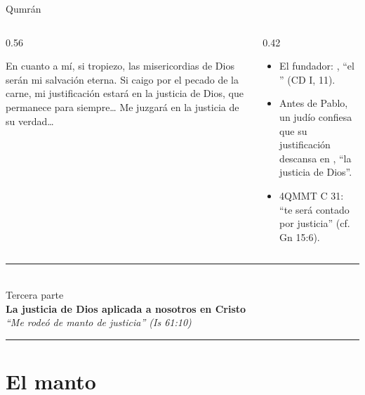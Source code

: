 \begin{frame}{Qumrán}
\begin{columns}[c,onlytextwidth]
\begin{column}{0.56\textwidth}
\begin{cita}En cuanto a mí, si tropiezo, las misericordias de Dios serán mi salvación eterna. Si caigo por el pecado de la carne, mi justificación estará en la justicia de Dios, que permanece para siempre\ldots{} Me juzgará en la justicia de su verdad\ldots{}\end{cita}
\end{column}
\begin{column}{0.42\textwidth}\small
\begin{itemize}
\item El fundador: , ``el '' (CD I, 11).
\item Antes de Pablo, un judío confiesa que su justificación descansa en , ``la justicia de Dios''.
\item 4QMMT C 31: ``te será contado por justicia'' (cf. Gn 15:6).
\end{itemize}
\end{column}
\end{columns}\par\smallskip
{}
\end{frame}

\begin{frame}[plain]
\vfill\centering
{\color{dorado}\rule{0.55\linewidth}{1.2pt}}\\[8pt]
{\large\color{gris}Tercera parte}\\[4pt]
{\LARGE\bfseries\color{azul}La justicia de Dios aplicada a nosotros en Cristo}\\[8pt]
{\small\itshape\color{gris}``Me rodeó de manto de justicia'' (Is 61:10)}\\[8pt]
{\color{dorado}\rule{0.55\linewidth}{1.2pt}}
\vfill
\end{frame}

\section{El manto}

